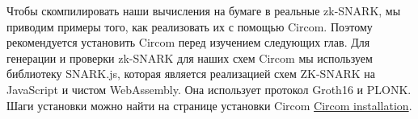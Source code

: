 Чтобы скомпилировать наши вычисления на бумаге в реальные zk-SNARK, мы приводим примеры того, как реализовать их с помощью Circom. Поэтому рекомендуется установить Circom перед изучением следующих глав. Для генерации и проверки zk-SNARK для наших схем Circom мы используем библиотеку SNARK.js, которая является реализацией схем ZK-SNARK на JavaScript и чистом WebAssembly. Она использует протокол Groth16 и PLONK. Шаги установки можно найти на странице установки Circom \href{https://docs.circom.io/getting-started/installation/#installing-circom}{Circom installation}.
